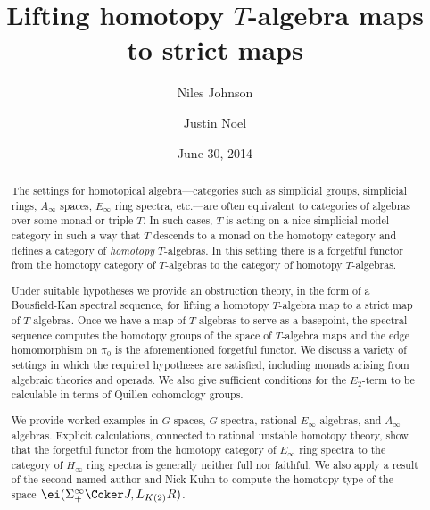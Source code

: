 \documentclass[leqno,oneside,english]{elsarticle}
\begin{document}
\begin{frontmatter}
  \title{Lifting homotopy $T$-algebra maps to strict maps}
  \date{June 30, 2014} 

  \author{Niles Johnson}
  \address{
    The Ohio State University Newark;
    1179 University Drive;
    Newark, OH 43055;
    USA
  }

  \author{Justin Noel}
  \address{
    UniversitÃ¤t Regensburg; 
    UniversitÃ¤tsstr. 31;
    Regensburg D-93040;
    Germany 
  }
  \begin{abstract}
     
The settings for homotopical algebra---categories such as simplicial
groups, simplicial rings, $A_\infty$ spaces, $E_\infty$ ring spectra,
etc.---are often equivalent to categories of algebras over
some monad or triple $T$. In such cases, $T$ is acting on a nice
simplicial model category in such a way that $T$ descends to a
monad on the homotopy category and defines a category of
\emph{homotopy} $T$-algebras. In this setting there is a forgetful
functor from the homotopy category of $T$-algebras to the category of
homotopy $T$-algebras.

Under suitable hypotheses we provide an obstruction theory, in the form of a
Bousfield-Kan spectral sequence, for lifting a homotopy $T$-algebra map to a
strict map of $T$-algebras. Once we have a map of $T$-algebras to serve as a
basepoint, the spectral sequence computes the homotopy groups of the space of
$T$-algebra maps and the edge homomorphism on $\pi_0$ is the aforementioned
forgetful functor. We discuss a variety of settings in which the required
hypotheses are satisfied, including monads arising from algebraic theories and
operads. We also give sufficient conditions for the $E_2$-term to be
calculable in terms of Quillen cohomology groups.

We provide worked examples in $G$-spaces, $G$-spectra, rational $E_\infty$ algebras,
and $A_\infty$ algebras. Explicit calculations, connected to rational unstable homotopy theory,
show that the forgetful functor from the homotopy category of $E_\infty$
ring spectra to the category of $H_\infty$ ring spectra is generally neither
full nor faithful.  We also apply a result of the second named author and Nick
Kuhn to compute the homotopy type of the space $\ei(\Sigma^\infty_+ \Coker J,
L_{K(2)} R)$.

  \end{abstract}

  \begin{keyword}
    
  \end{keyword}
\end{frontmatter}
\end{document}
